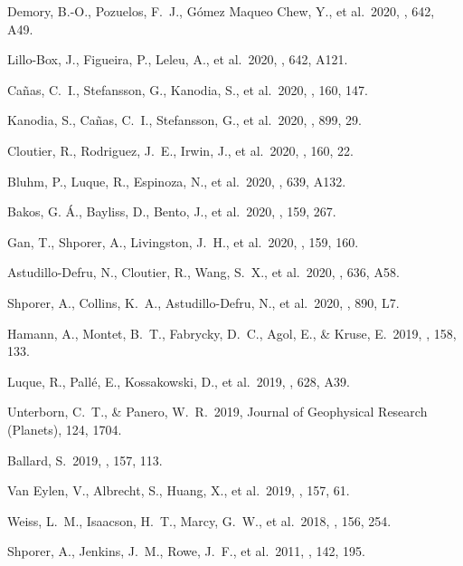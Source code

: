  Demory, B.-O., Pozuelos, F.~J., G{\'o}mez Maqueo Chew, Y., et al.\ 2020, \aap, 642, A49.

 Lillo-Box, J., Figueira, P., Leleu, A., et al.\ 2020, \aap, 642, A121.

 Ca{\~n}as, C.~I., Stefansson, G., Kanodia, S., et al.\ 2020, \aj, 160, 147.

 Kanodia, S., Ca{\~n}as, C.~I., Stefansson, G., et al.\ 2020, \apj, 899, 29.

 Cloutier, R., Rodriguez, J.~E., Irwin, J., et al.\ 2020, \aj, 160, 22.

 Bluhm, P., Luque, R., Espinoza, N., et al.\ 2020, \aap, 639, A132.

 Bakos, G. {\'A}., Bayliss, D., Bento, J., et al.\ 2020, \aj, 159, 267.

 Gan, T., Shporer, A., Livingston, J.~H., et al.\ 2020, \aj, 159, 160.

 Astudillo-Defru, N., Cloutier, R., Wang, S.~X., et al.\ 2020, \aap, 636, A58.

 Shporer, A., Collins, K.~A., Astudillo-Defru, N., et al.\ 2020, \apjl, 890, L7.

 Hamann, A., Montet, B.~T., Fabrycky, D.~C., Agol, E., \& Kruse, E.\ 2019, \aj, 158, 133.

 Luque, R., Pall{\'e}, E., Kossakowski, D., et al.\ 2019, \aap, 628, A39.

 Unterborn, C.~T., \& Panero, W.~R.\ 2019, Journal of Geophysical Research (Planets), 124, 1704.

 Ballard, S.\ 2019, \aj, 157, 113.

 Van Eylen, V., Albrecht, S., Huang, X., et al.\ 2019, \aj, 157, 61.

 Weiss, L.~M., Isaacson, H.~T., Marcy, G.~W., et al.\ 2018, \aj, 156, 254.


 Shporer, A., Jenkins, J.~M., Rowe, J.~F., et al.\ 2011, \aj, 142, 195.



